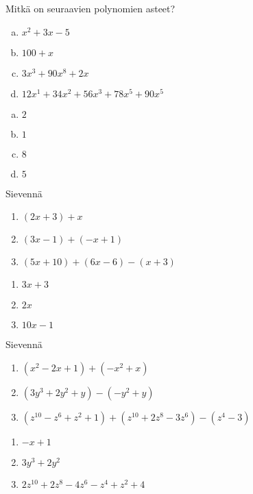 \begin{tehtava}
	Mitkä on seuraavien polynomien asteet?
	\begin{enumerate}[a)]
		\item $x^2 + 3x - 5$
		\item $100 + x$
		\item $3x^3 + 90x^8 + 2x$
		\item $12x^1 + 34x^2 + 56x^3 + 78x^5 + 90x^5$
	\end{enumerate}

	\begin{vastaus}
		\begin{enumerate}[a)]
			\item $2$
			\item $1$
			\item $8$
			\item $5$
		\end{enumerate}
	\end{vastaus}
\end{tehtava}

\begin{tehtava}
    Sievennä
    \begin{enumerate}
        \item $(2x + 3) + x $
        \item $(3x - 1) + (-x + 1)$
        \item $(5x + 10) + (6x - 6) - (x + 3)$
    \end{enumerate}
    \begin{vastaus}
        \begin{enumerate}
            \item $3x + 3$
            \item $2x$
            \item $10x - 1$
        \end{enumerate}
    \end{vastaus}
\end{tehtava}

\begin{tehtava}
    Sievennä
    \begin{enumerate}
        \item $(x^2 - 2x + 1) + (-x^2 + x) $
        \item $(3y^3 + 2y^2  + y) - (-y^2 + y)$
        \item $(z^{10} - z^6 + z^2 + 1) + (z^{10} + 2z^8 - 3z^6) - (z^4 - 3)$
    \end{enumerate}
    \begin{vastaus}
        \begin{enumerate}
            \item $-x + 1$
            \item $3y^3 + 2y^2$
            \item $2z^{10} + 2z^8 - 4z^6 - z^4 + z^2 + 4$
        \end{enumerate}
    \end{vastaus}
\end{tehtava}

